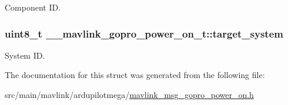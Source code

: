 Component I\+D. 

\hypertarget{struct____mavlink__gopro__power__on__t_a45ee6af4b3ca38f0244c4138f421aa1a}{
\subsubsection[{target\+\_\+system}]{\setlength{\rightskip}{0pt plus 5cm}uint8\+\_\+t \+\_\+\+\_\+mavlink\+\_\+gopro\+\_\+power\+\_\+on\+\_\+t\+::target\+\_\+system}}\label{struct____mavlink__gopro__power__on__t_a45ee6af4b3ca38f0244c4138f421aa1a}


System I\+D. 



The documentation for this struct was generated from the following file\+:\begin{DoxyCompactItemize}
\item 
src/main/mavlink/ardupilotmega/\hyperlink{mavlink__msg__gopro__power__on_8h}{mavlink\+\_\+msg\+\_\+gopro\+\_\+power\+\_\+on.\+h}\end{DoxyCompactItemize}
